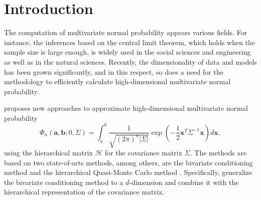\section{Introduction}

The computation of multivariate normal probability appears various fields. For instance, the inferences based on the central limit theorem, which holds when the sample size is large enough, is widely used in the social sciences and engineering as well as in the natural sciences. Recently, the dimensionality of data and models has been grown significantly, and in this respect, so does a need for the methodology to efficiently calculate high-dimensional multivariate normal probability.

\citet{cao2019hierarchical} proposes new approaches to approximate high-dimensional multivariate normal probability 
\begin{equation}\label{eqn:normalprob}
    \Phi_n(\mathbf{a}, \mathbf{b}; 0, \Sigma) = \int_a^b \frac{1}{\sqrt{(2\pi)^n |\Sigma|}} \exp\left( -\frac{1}{2} \mathbf{x}^T \Sigma^{-1} \mathbf{x} \right) d\mathbf{x},
\end{equation}
using the hierarchical matrix $\mathcal{H}$ \citep{hackbusch2015hierarchical} for the covariance matrix $\Sigma$. The methods are based on two state-of-arts methods, among others, are the bivariate conditioning method \citep{trinh2015bivariate} and the hierarchical Quasi-Monte Carlo method \citep{genton2018hierarchical}. Specifically, \citet{cao2019hierarchical} generalize the bivariate conditioning method to a $d$-dimension and combine it with the hierarchical representation of the covariance matrix. 

